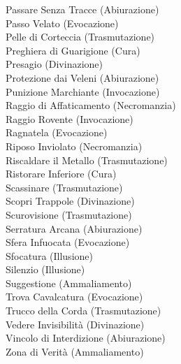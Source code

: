 \begin{multicols}{3}
	Passare Senza Tracce (Abiurazione)\\
	Passo Velato (Evocazione)\\
	Pelle di Corteccia (Trasmutazione)\\
	Preghiera di Guarigione (Cura)\\
	Presagio (Divinazione)\\
	Protezione dai Veleni (Abiurazione)\\
	Punizione Marchiante (Invocazione)\\
	Raggio di Affaticamento (Necromanzia)\\
	Raggio Rovente (Invocazione)\\
	Ragnatela (Evocazione)\\
	Riposo Inviolato (Necromanzia)\\
	Riscaldare il Metallo (Trasmutazione)\\
	Ristorare Inferiore (Cura)\\
	Scassinare (Trasmutazione)\\
	Scopri Trappole (Divinazione)\\
	Scurovisione (Trasmutazione)\\
	Serratura Arcana (Abiurazione)\\
	Sfera Infuocata (Evocazione)\\
	Sfocatura (Illusione)\\
	Silenzio (Illusione)\\
	Suggestione (Ammaliamento)\\
	Trova Cavalcatura (Evocazione)\\
	Trucco della Corda (Trasmutazione)\\
	Vedere Invisibilità (Divinazione)\\
	Vincolo di Interdizione (Abiurazione)\\
	Zona di Verità (Ammaliamento)\\
	

\end{multicols}
